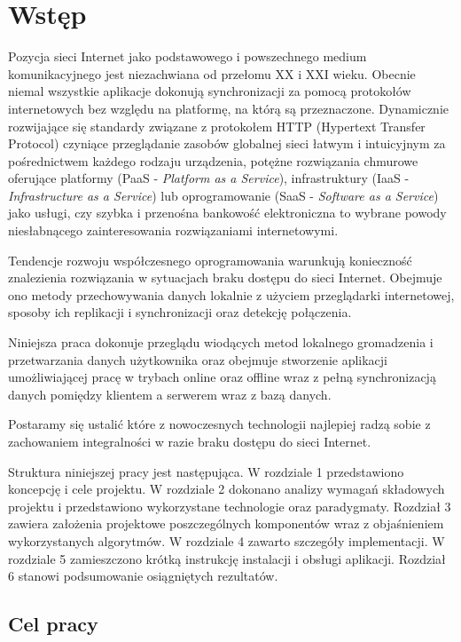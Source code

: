 \chapter{Wstęp}
\label{cha:wstep}

Pozycja sieci Internet jako podstawowego i powszechnego medium komunikacyjnego jest niezachwiana od przełomu XX i XXI wieku. Obecnie niemal wszystkie aplikacje dokonują synchronizacji za pomocą protokołów internetowych bez względu na platformę, na którą są przeznaczone. Dynamicznie rozwijające się standardy związane z protokołem HTTP (Hypertext Transfer Protocol) czyniące przeglądanie zasobów globalnej sieci łatwym i intuicyjnym za pośrednictwem każdego rodzaju urządzenia, potężne rozwiązania chmurowe oferujące platformy (PaaS - \emph{Platform as a Service}), infrastruktury (IaaS - \emph{Infrastructure as a Service}) lub oprogramowanie (SaaS - \emph{Software as a Service}) jako usługi, czy szybka i przenośna bankowość elektroniczna to wybrane powody niesłabnącego zainteresowania rozwiązaniami internetowymi.

Tendencje rozwoju współczesnego oprogramowania warunkują konieczność znalezienia rozwiązania w sytuacjach braku dostępu do sieci Internet. Obejmuje ono metody przechowywania danych lokalnie z użyciem przeglądarki internetowej, sposoby ich replikacji i synchronizacji oraz detekcję połączenia.

Niniejsza praca dokonuje przeglądu wiodących metod lokalnego gromadzenia i przetwarzania danych użytkownika oraz obejmuje stworzenie aplikacji umożliwiającej pracę w trybach online oraz offline wraz z pełną synchronizacją danych pomiędzy klientem a serwerem wraz z bazą danych.

Postaramy się ustalić które z nowoczesnych technologii najlepiej radzą sobie z zachowaniem integralności w razie braku dostępu do sieci Internet.

Struktura niniejszej pracy jest następująca. W rozdziale 1 przedstawiono koncepcję i cele projektu. W rozdziale 2 dokonano analizy wymagań składowych projektu i przedstawiono wykorzystane technologie oraz paradygmaty. Rozdział 3 zawiera założenia projektowe poszczególnych komponentów wraz z objaśnieniem wykorzystanych algorytmów. W rozdziale 4 zawarto szczegóły implementacji. W rozdziale 5 zamieszczono krótką instrukcję instalacji i obsługi aplikacji. Rozdział 6 stanowi podsumowanie osiągniętych rezultatów.

\section{Cel pracy}
\label{sec:celPracy}

